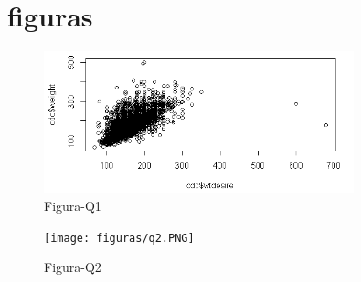 \section{figuras}

\begin{figure}[htbp] %
	\centering
	\includegraphics[width=0.8\textwidth]{figuras/q1.PNG}
	\caption{Figura-Q1}
	\label{Nome-da-legenda-da-figura1}
\end{figure}

\begin{figure}[htbp] %
	\centering
	\texttt{[image: figuras/q2.PNG]}
	\caption{Figura-Q2}
	\label{Nome-da-legenda-da-figura2}
\end{figure}